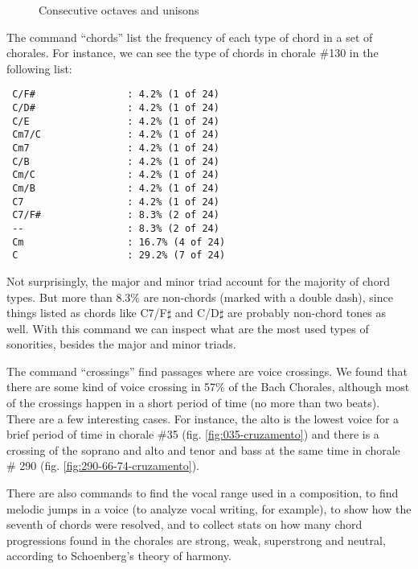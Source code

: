 \begin{figure}[!h]
  \centering
  \qquad
  \qquad
  \caption{Consecutive octaves and unisons}
  \label{fig:oitavas-e-unissonos}
\end{figure}

The command ``chords'' list the frequency of each type of chord in a
set of chorales. For instance, we can see the type of chords in
chorale \#130 in the following list:

\begin{verbatim}
 C/F#                : 4.2% (1 of 24)
 C/D#                : 4.2% (1 of 24)
 C/E                 : 4.2% (1 of 24)
 Cm7/C               : 4.2% (1 of 24)
 Cm7                 : 4.2% (1 of 24)
 C/B                 : 4.2% (1 of 24)
 Cm/C                : 4.2% (1 of 24)
 Cm/B                : 4.2% (1 of 24)
 C7                  : 4.2% (1 of 24)
 C7/F#               : 8.3% (2 of 24)
 --                  : 8.3% (2 of 24)
 Cm                  : 16.7% (4 of 24)
 C                   : 29.2% (7 of 24)
\end{verbatim}

Not surprisingly, the major and minor triad account for the majority
of chord types. But more than 8.3\% are non-chords (marked with a
double dash), since things listed as chords like C7/F$\sharp$ and
C/D$\sharp$ are probably non-chord tones as well. With this command we
can inspect what are the most used types of sonorities, besides the
major and minor triads.

The command ``crossings'' find passages where are voice crossings. We
found that there are some kind of voice crossing in 57\% of the Bach
Chorales, although most of the crossings happen in a short period of
time (no more than two beats). There are a few interesting cases. For
instance, the alto is the lowest voice for a brief period of time in
chorale \#35 (fig. \ref{fig:035-cruzamento}) and there is a crossing
of the soprano and alto and tenor and bass at the same time in chorale
\# 290 (fig. \ref{fig:290-66-74-cruzamento}).

There are also commands to find the vocal range used in a composition,
to find melodic jumps in a voice (to analyze vocal writing, for
example), to show how the seventh of chords were resolved, and to
collect stats on how many chord progressions found in the chorales are
strong, weak, superstrong and neutral, according to Schoenberg's
theory of harmony.

